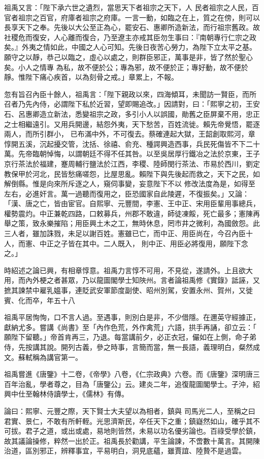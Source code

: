 \begin{pinyinscope}
 祖禹又言：「陛下承六世之遺烈，當思天下者祖宗之天下，人
 民者祖宗之人民，百官者祖宗之百官，府庫者祖宗之府庫。一言一動，如臨之在上，質之在傍，則可以長享天下之奉。先後以大公至正為心，罷安石、惠卿所造新法，而行祖宗舊政。故社稷危而復安，人心離而復合，乃至遼主亦戒其臣勿生事曰：『南朝專行仁宗之政矣。』外夷之情如此，中國之人心可知。先後日夜苦心勞力，為陛下立太平之基。願守之以靜，恭己以臨之，虛心以處之，則群臣邪正，萬事是非，皆了然於聖心矣。小人之情專
 為私，故不便於公；專為邪，故不便於正；專好動，故不便於靜。惟陛下痛心疾首，以為刻骨之戒。」章累上，不報。



 忽有旨召內臣十餘人，祖禹言：「陛下親政以來，四海傾耳，未聞訪一賢臣，而所召者乃先內侍，必謂陛下私於近習，望即賜追改。」因請對，曰：「熙寧之初，王安石、呂惠卿造立新法，悉變祖宗之政，多引小人以誤國，勛舊之臣屏棄不用，忠正之士相繼遠引。又用兵開邊，結怨外夷，天下愁苦，百姓流徙。賴先帝覺悟，罷逐兩人，而所引群小，
 已布滿中外，不可復去。蔡確連起大獄，王韶創取熙河，章惇開五溪，沉起擾交管，沈括、徐禧、俞充、種諤興造西事，兵民死傷皆不下二十萬。先帝臨朝悼悔，以謂朝廷不得不任其咎。以至吳居厚行鐵冶之法於京東，王子京行茶法於福建，蹇周輔行鹽法於江西，李稷、陸師閔行茶法、市易於西川，劉定教保甲於河北，民皆愁痛嗟怨，比屋思亂。賴陛下與先後起而救之，天下之民，如解倒縣。惟是向來所斥逐之人，窺伺事變，妄意陛下不以
 修改法度為是，如得至左右，必進奸言。萬一過聽而復用之，臣恐國家自此陵遲，不復振矣。」又論：「漢、唐之亡，皆由宦官。自熙寧、元豐間，李憲、王中正、宋用臣輩用事總兵，權勢震灼。中正兼乾四路，口敕募兵，州郡不敢違，師徒凍餒，死亡最多；憲陳再舉之策，致永樂摧陷；用臣興土木之工，無時休息，罔市井之微利，為國斂怨。此三人者，雖加誅戮，未足以謝百姓。憲雖已亡，而中正、用臣尚在，今召內臣十人，而憲、中正之子皆在其中。二人既入，
 則中正、用臣必將復用，願陛下念之。」



 時紹述之論已興，有相章惇意。祖禹力言惇不可用，不見從，遂請外。上且欲大用，而內外梗之者甚眾，乃以龍圖閣學士知陜州。言者論祖禹修《實錄》詆誣，又摭其諫禁中雇乳媼事，連貶武安軍節度副使、昭州別駕，安置永州、賀州，又徙賓、化而卒，年五十八



 祖禹平居恂恂，口不言人過。至遇事，則別白是非，不少借隱。在邇英守經據正，獻納尤多。嘗講《尚書》至「內作色荒，外作禽荒」六語，拱手再誦，卻立云：「
 願陛下留聽。」帝首肯再三，乃退。每當講前夕，必正衣冠，儼如在上側，命子弟侍，先按講其說。開列古義，參之時事，言簡而當，無一長語，義理明白，粲然成文。蘇軾稱為講官第一。



 祖禹嘗進《唐鑒》十二卷，《帝學》八卷，《仁宗政典》六卷。而《唐鑒》深明唐三百年治亂，學者尊之，目為「唐鑒公」云。建炎二年，追復龍圖閣學士。子沖，紹興中仕至翰林侍讀學士，《儒林》有傳。



 論曰：熙寧、元豐之際，天下賢士大夫望以為相者，鎮與
 司馬光二人，至稱之曰君實、景仁，不敢有所軒輊。光思濟斯民，卒任天下之重；鎮嶷然如山，確乎其不可拔。君子之道，或出或處，易地則皆然，未易以功名優劣論也。百祿受學於鎮，故其議論操修，粹然一出於正。祖禹長於勸講，平生論諫，不啻數十萬言。其開陳治道，區別邪正，辨釋事宜，平易明白，洞見底蘊，雖賈誼、陸贄不是過雲。



\end{pinyinscope}